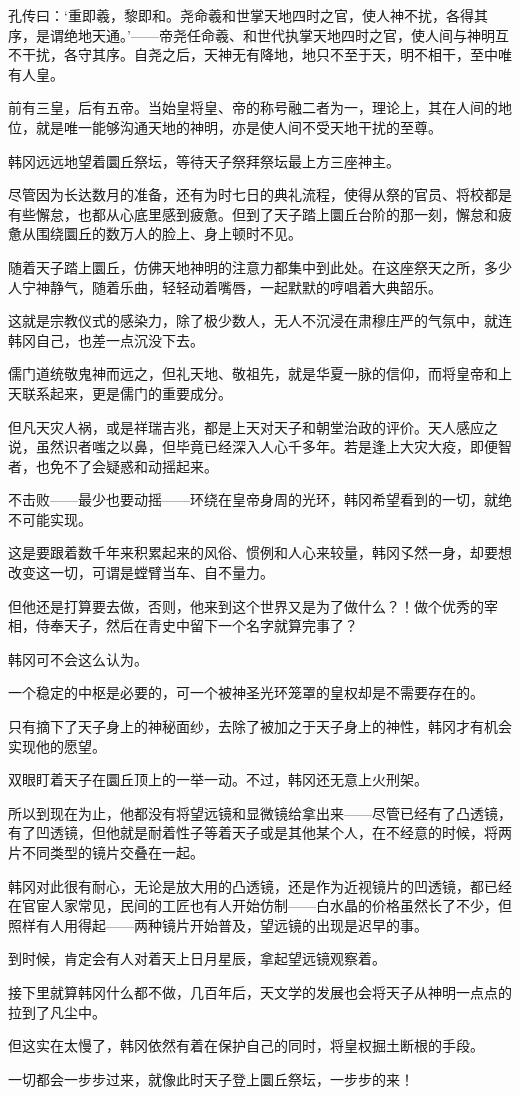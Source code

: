 孔传曰：‘重即羲，黎即和。尧命羲和世掌天地四时之官，使人神不扰，各得其序，是谓绝地天通。’——帝尧任命羲、和世代执掌天地四时之官，使人间与神明互不干扰，各守其序。自尧之后，天神无有降地，地只不至于天，明不相干，至中唯有人皇。

前有三皇，后有五帝。当始皇将皇、帝的称号融二者为一，理论上，其在人间的地位，就是唯一能够沟通天地的神明，亦是使人间不受天地干扰的至尊。

韩冈远远地望着圜丘祭坛，等待天子祭拜祭坛最上方三座神主。

尽管因为长达数月的准备，还有为时七日的典礼流程，使得从祭的官员、将校都是有些懈怠，也都从心底里感到疲惫。但到了天子踏上圜丘台阶的那一刻，懈怠和疲惫从围绕圜丘的数万人的脸上、身上顿时不见。

随着天子踏上圜丘，仿佛天地神明的注意力都集中到此处。在这座祭天之所，多少人宁神静气，随着乐曲，轻轻动着嘴唇，一起默默的哼唱着大典韶乐。

这就是宗教仪式的感染力，除了极少数人，无人不沉浸在肃穆庄严的气氛中，就连韩冈自己，也差一点沉没下去。

儒门道统敬鬼神而远之，但礼天地、敬祖先，就是华夏一脉的信仰，而将皇帝和上天联系起来，更是儒门的重要成分。

但凡天灾人祸，或是祥瑞吉兆，都是上天对天子和朝堂治政的评价。天人感应之说，虽然识者嗤之以鼻，但毕竟已经深入人心千多年。若是逢上大灾大疫，即便智者，也免不了会疑惑和动摇起来。

不击败——最少也要动摇——环绕在皇帝身周的光环，韩冈希望看到的一切，就绝不可能实现。

这是要跟着数千年来积累起来的风俗、惯例和人心来较量，韩冈孓然一身，却要想改变这一切，可谓是螳臂当车、自不量力。

但他还是打算要去做，否则，他来到这个世界又是为了做什么？！做个优秀的宰相，侍奉天子，然后在青史中留下一个名字就算完事了？

韩冈可不会这么认为。

一个稳定的中枢是必要的，可一个被神圣光环笼罩的皇权却是不需要存在的。

只有摘下了天子身上的神秘面纱，去除了被加之于天子身上的神性，韩冈才有机会实现他的愿望。

双眼盯着天子在圜丘顶上的一举一动。不过，韩冈还无意上火刑架。

所以到现在为止，他都没有将望远镜和显微镜给拿出来——尽管已经有了凸透镜，有了凹透镜，但他就是耐着性子等着天子或是其他某个人，在不经意的时候，将两片不同类型的镜片交叠在一起。

韩冈对此很有耐心，无论是放大用的凸透镜，还是作为近视镜片的凹透镜，都已经在官宦人家常见，民间的工匠也有人开始仿制——白水晶的价格虽然长了不少，但照样有人用得起——两种镜片开始普及，望远镜的出现是迟早的事。

到时候，肯定会有人对着天上日月星辰，拿起望远镜观察着。

接下里就算韩冈什么都不做，几百年后，天文学的发展也会将天子从神明一点点的拉到了凡尘中。

但这实在太慢了，韩冈依然有着在保护自己的同时，将皇权掘土断根的手段。

一切都会一步步过来，就像此时天子登上圜丘祭坛，一步步的来！

